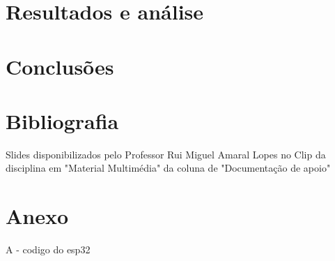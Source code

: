 \documentclass[12pt]{article}
\begin{document}
    \section{Resultados e análise}
    \section{Conclusões}
    \section{Bibliografia}
    Slides disponibilizados pelo Professor Rui Miguel Amaral Lopes no Clip da disciplina em "Material Multimédia" da coluna de "Documentação de apoio"
    \section*{Anexo}
    A - codigo do esp32
\end{document}
